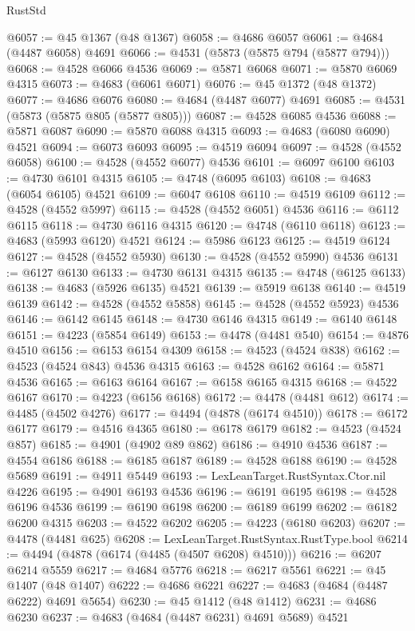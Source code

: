 \begin{lexlean}{RustStd}
\begin{coremodule}
@6057 := @45 @1367 (@48 @1367)
@6058 := @4686 @6057
@6061 := @4684 (@4487 @6058) @4691
@6066 := @4531 (@5873 (@5875 @794 (@5877 @794)))
@6068 := @4528 @6066 @4536
@6069 := @5871 @6068
@6071 := @5870 @6069 @4315
@6073 := @4683 (@6061 @6071)
@6076 := @45 @1372 (@48 @1372)
@6077 := @4686 @6076
@6080 := @4684 (@4487 @6077) @4691
@6085 := @4531 (@5873 (@5875 @805 (@5877 @805)))
@6087 := @4528 @6085 @4536
@6088 := @5871 @6087
@6090 := @5870 @6088 @4315
@6093 := @4683 (@6080 @6090) @4521
@6094 := @6073 @6093
@6095 := @4519 @6094
@6097 := @4528 (@4552 @6058)
@6100 := @4528 (@4552 @6077) @4536
@6101 := @6097 @6100
@6103 := @4730 @6101 @4315
@6105 := @4748 (@6095 @6103)
@6108 := @4683 (@6054 @6105) @4521
@6109 := @6047 @6108
@6110 := @4519 @6109
@6112 := @4528 (@4552 @5997)
@6115 := @4528 (@4552 @6051) @4536
@6116 := @6112 @6115
@6118 := @4730 @6116 @4315
@6120 := @4748 (@6110 @6118)
@6123 := @4683 (@5993 @6120) @4521
@6124 := @5986 @6123
@6125 := @4519 @6124
@6127 := @4528 (@4552 @5930)
@6130 := @4528 (@4552 @5990) @4536
@6131 := @6127 @6130
@6133 := @4730 @6131 @4315
@6135 := @4748 (@6125 @6133)
@6138 := @4683 (@5926 @6135) @4521
@6139 := @5919 @6138
@6140 := @4519 @6139
@6142 := @4528 (@4552 @5858)
@6145 := @4528 (@4552 @5923) @4536
@6146 := @6142 @6145
@6148 := @4730 @6146 @4315
@6149 := @6140 @6148
@6151 := @4223 (@5854 @6149)
@6153 := @4478 (@4481 @540)
@6154 := @4876 @4510
@6156 := @6153 @6154 @4309
@6158 := @4523 (@4524 @838)
@6162 := @4523 (@4524 @843) @4536 @4315
@6163 := @4528 @6162
@6164 := @5871 @4536
@6165 := @6163 @6164
@6167 := @6158 @6165 @4315
@6168 := @4522 @6167
@6170 := @4223 (@6156 @6168)
@6172 := @4478 (@4481 @612)
@6174 := @4485 (@4502 @4276)
@6177 := @4494 (@4878 (@6174 @4510))
@6178 := @6172 @6177
@6179 := @4516 @4365
@6180 := @6178 @6179
@6182 := @4523 (@4524 @857)
@6185 := @4901 (@4902 @89 @862)
@6186 := @4910 @4536
@6187 := @4554 @6186
@6188 := @6185 @6187
@6189 := @4528 @6188
@6190 := @4528 @5689
@6191 := @4911 @5449
@6193 := LexLeanTarget.RustSyntax.Ctor.nil @4226
@6195 := @4901 @6193 @4536
@6196 := @6191 @6195
@6198 := @4528 @6196 @4536
@6199 := @6190 @6198
@6200 := @6189 @6199
@6202 := @6182 @6200 @4315
@6203 := @4522 @6202
@6205 := @4223 (@6180 @6203)
@6207 := @4478 (@4481 @625)
@6208 := LexLeanTarget.RustSyntax.RustType.bool
@6214 := @4494 (@4878 (@6174 (@4485 (@4507 @6208) @4510)))
@6216 := @6207 @6214 @5559
@6217 := @4684 @5776
@6218 := @6217 @5561
@6221 := @45 @1407 (@48 @1407)
@6222 := @4686 @6221
@6227 := @4683 (@4684 (@4487 @6222) @4691 @5654)
@6230 := @45 @1412 (@48 @1412)
@6231 := @4686 @6230
@6237 := @4683 (@4684 (@4487 @6231) @4691 @5689) @4521

\end{coremodule}
\end{lexlean}

